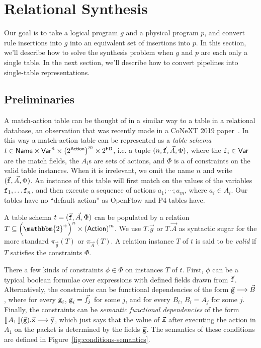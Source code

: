 \section{Relational Synthesis}

Our goal is to take a logical program $g$ and a physical program $p$,
and convert rule insertions into $g$ into an equivalent set of
insertions into $p$. In this section, we'll describe how to solve the
synthesis problem when $g$ and $p$ are each only a single table. In
the next section, we'll describe how to convert pipelines into
single-table representations.

\subsection{Preliminaries}
A match-action table can be thought of in a similar way to a table in
a relational database, an observation that was recently made in a
CoNeXT 2019 paper~\cite{Chiesa}. In this way a match-action table can
be represented as a \emph{table schema}
$t \in \mathsf{Name} \times \mathsf{Var}^n \times \left(2^{\mathsf{Action}}\right)^m
\times 2^{\mathsf{FD}}$, i.e. a tuple $(n,\vec{\texttt{f}}, \vec{A}, \Phi)$, where
the $\texttt{f}_i \in \mathsf{Var}$ are the match fields, the $A_i$s are sets of
actions, and $\Phi$ is a of constraints on the valid table
instances. When it is irrelevant, we omit the name $n$ and write
$(\vec{\texttt{f}}, \vec{A}, \Phi)$. An instance of this table will first
match on the values of the variables $\texttt{f}_1, \ldots \texttt{f}_n$, and
then execute a sequence of actions $a_1;\cdots;a_m$, where
$a_i \in A_i$. Our tables have no ``default action'' as OpenFlow and
P4 tables have.

A table schema $t = (\vec{\texttt{f}}, \vec{A}, \Phi)$ can be populated by
a relation
$T \subseteq \left(\mathbbm {2}^+\right)^n \times
\left(\mathsf{Action}\right)^m$. We use $T.\vec g$ or $T.\vec A$ as
syntactic sugar for the more standard $\pi_{\vec g}(T)$ or
$\pi_{\vec A}(T)$. A relation instance $T$ of $t$ is said to be
\emph{valid} if $T$ satisfies the constraints $\Phi$.

There a few kinds of constraints $ \phi \in \Phi$ on instances $T$ of
$t$. First, $\phi$ can be a typical boolean formulae over expressions
with defined fields drawn from $\vec{\texttt{f}}$. Alternatively, the
constraints can be functional dependencies of the form
$\vec{\texttt{g}} \longrightarrow \vec{B}$, where for every $\texttt{g}_i$,
$\texttt{g}_i = \vec f_j$ for some $j$, and for every $B_i$, $B_i = A_j$
for some $j$. Finally, the constraints can be \emph{semantic
  functional dependencies} of the form
$\llbracket\,A_1\,\rrbracket(\vec{\texttt{g}}).\vec{\texttt{x}} \longrightarrow \vec{\texttt{y}}$, which just says that the value of $\vec{\texttt{x}}$ after
executing the action in $A_1$ on the packet is determined by the
fields $\vec{\texttt{g}}$. The semantics of these conditions are defined
in Figure~\ref{fig:conditions-semantics}.

